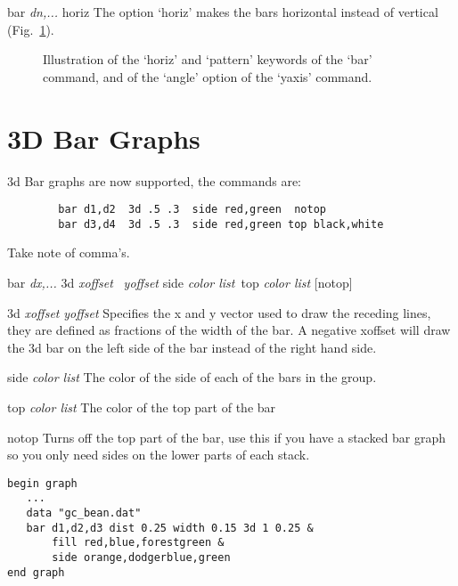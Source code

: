 \begin{commanddescription}
\item[{\sf bar {\it dn,...} horiz}]
The option `{\sf horiz}' makes the bars horizontal instead of vertical (Fig.~\ref{hbar:fig}).

\begin{figure}[tb]
\centering

\caption{\label{hbar:fig}Illustration of the `{\sf horiz}' and `{\sf pattern}' keywords of the `{\sf bar}' command, and of the `{\sf angle}' option of the `{\sf yaxis}' command.}
\end{figure}
\end{commanddescription}

\section{3D Bar Graphs}
3d Bar graphs are now supported, the commands are:

\preglecode{}
\begin{Verbatim}
        bar d1,d2  3d .5 .3  side red,green  notop
        bar d3,d4  3d .5 .3  side red,green top black,white
\end{Verbatim}
\postglecode{}

Take note of comma's.
\begin{commanddescription}
\item[{\sf bar {\it dx,...} 3d {\it xoffset} \  {\it yoffset} side {\it color list}\ top {\it color list} [notop]}]
   
 

\item[{\sf 3d  {\it xoffset} {\it yoffset} }]
Specifies the x and y vector used to draw the receding
lines, they are defined as fractions of the width of the
bar.
A negative xoffset will draw the 3d bar on the left side
of the bar instead of the right hand side.

\item[{\sf side {\it color list} }]
The color of the side of each of the bars in the group.

\item[{\sf top {\it color list}}]
The color of the top part of the bar

\item[{\sf notop}]
Turns off the top part of the bar, use this if you have
a stacked bar graph so you only need sides on the lower parts
of each stack.

\begin{minipage}[c]{8cm}
\begin{Verbatim}
begin graph
   ...
   data "gc_bean.dat"
   bar d1,d2,d3 dist 0.25 width 0.15 3d 1 0.25 &
       fill red,blue,forestgreen &
       side orange,dodgerblue,green
end graph
\end{Verbatim}
\end{minipage}
\hfill
\begin{minipage}[c]{7cm}
\mbox{}
\end{minipage}
\end{commanddescription}

